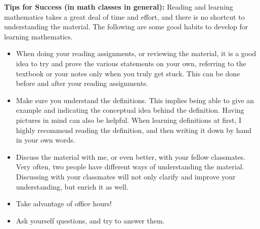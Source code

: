 \documentclass[11pt]{article}
\begin{document}
\textbf{\large Tips for Success (in math classes in general):} Reading and learning mathematics takes a great deal of time and effort, and there is no shortcut to understanding the material. The following are some good habits to develop for learning mathematics. 
\begin{itemize}
	\item When doing your reading assignments, or reviewing the material, it is a good idea to try and prove the various statements on your own, referring to the textbook or your notes only when you truly get stuck. This can be done before and after your reading assignments.
	\item Make sure you understand the definitions. This implies being able to give an example and indicating the conceptual idea behind the definition. Having pictures in mind can also be helpful. When learning definitions at first, I highly recommend reading the definition, and then writing it down by hand in your own words. 
	\item Discuss the material with me, or even better, with your fellow classmates. Very often, two people have different ways of understanding the material. Discussing with your classmates will not only clarify and improve your understanding, but enrich it as well. 
	\item Take advantage of office hours!
	\item Ask yourself questions, and try to answer them. 
\end{itemize}
%
%
%
%
%
\end{document}
